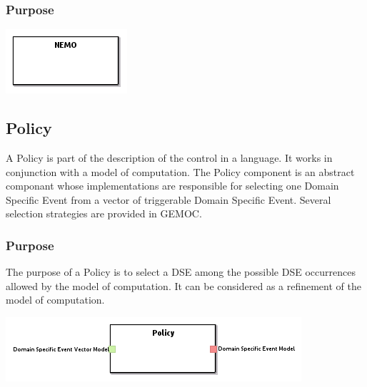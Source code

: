\documentclass{gemoc} %
\begin{document}

\subsubsection{Purpose}


\begin{center}
\includegraphics*[trim=0.0cm 0.0cm 0cm 0.0cm, clip=true]{../images/generated/Generated_NEMO.png}
\end{center}




\subsection{Policy}
\label{sec:Policy}
A Policy is part of the description of the control in a language. It works in conjunction with a model of computation.
The Policy component is an abstract componant whose implementations are responsible for selecting one Domain Specific Event from a vector of triggerable Domain Specific Event. Several selection strategies are provided in GEMOC.

\subsubsection{Purpose}
The purpose of a Policy is to select a DSE among the possible DSE occurrences allowed by the model of computation. It can be considered as a refinement of the model of computation.

\begin{center}
\includegraphics*[trim=0.0cm 0.0cm 0cm 0.0cm, clip=true]{../images/generated/Generated_Policy.png}
\end{center}
\end{document}
